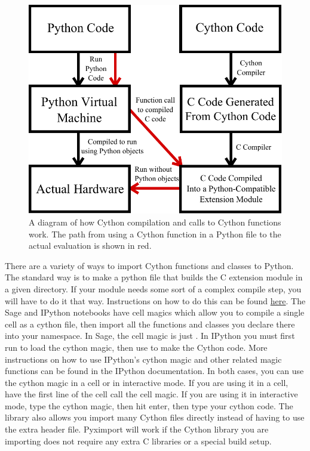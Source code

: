 \begin{figure}
\includegraphics[width=\textwidth]{compilation.pdf}
\caption{A diagram of how Cython compilation and calls to Cython functions work.
The path from using a Cython function in a Python file to the actual evaluation is shown in red.}
\label{cython:compilation}
\end{figure}

There are a variety of ways to import Cython functions and classes to Python.
The standard way is to make a python file that builds the C extension module in a given directory.
If your module needs some sort of a complex compile step, you will have to do it that way.
Instructions on how to do this can be found \href{http://docs.cython.org/src/reference/compilation.html}{here}.
The Sage and IPython notebooks have cell magics which allow you to compile a single cell as a cython file, then import all the functions and classes you declare there into your namespace.
In Sage, the cell magic is just .
In IPython you must first run  to load the cython magic, then use  to make the Cython code.
More instructions on how to use IPython's cython magic and other related magic functions can be found in the IPython documentation.
In both cases, you can use the cython magic in a cell or in interactive mode.
If you are using it in a cell, have the first line of the cell call the cell magic.
If you are using it in interactive mode, type the cython magic, then hit enter, then type your cython code.
The library  also allows you import many Cython files directly instead of having to use the extra header file.
Pyximport will work if the Cython library you are importing does not require any extra C libraries or a special build setup.

